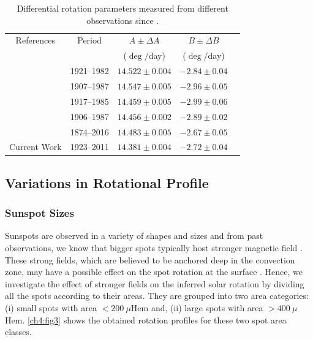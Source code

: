 \begin{table}
\centering
\begin{tabular}{ ccccc }
\hline
     References  & Period  & $A \pm \Delta A$ & $B \pm \Delta B$ \\
      & & ($\deg$$/$day) & ($\deg$$/$day) & \\
    \hline

    \citet{Howard1984}         & 1921--1982 & $14.522  \pm 0.004$   & $-2.84 \pm 0.04$    \\
    \citet{Howard1999}
                            & 1907--1987 & $14.547\pm 0.005$     & $-2.96\pm 0.05$     \\
    \citet{Howard1999}
                           & 1917--1985 & $14.459\pm 0.005$     & $-2.99\pm 0.06$     \\
    \citet{Gupta1999}
                          & 1906--1987  & $14.456 \pm 0.002$    & $-2.89 \pm 0.02$    \\
    \citet{Ruzdjak2017}
                          & 1874--2016  & $14.483\pm 0.005$     & $-2.67\pm 0.05$     \\

    Current Work
                           & 1923--2011 & $14.381\pm 0.004$        & $-2.72\pm0.04$  \\
\hline
\end{tabular}
\caption{Differential rotation parameters measured from different observations since \citeyear{Carrington1863}.}
\label{ch4:table1}
\end{table}

\subsection{Variations in Rotational Profile}

\subsubsection{Sunspot Sizes}
\label{sizes}
Sunspots are observed in a variety of shapes and sizes and from past observations, we know that bigger spots typically host stronger magnetic field \citep{MunozJaramillo2015}. These strong fields, which are believed to be anchored deep in the convection zone, may have a possible effect on the spot rotation at the surface \citep{Ward1966, Gilman1983, Gupta1999}. Hence, we investigate the effect of stronger fields on the inferred solar rotation by dividing all the spots according to their areas. They are grouped into two area categories:  (i) small spots with area  $<200~\mu$Hem and, (ii) large spots with area  $>400~\mu$Hem. \autoref{ch4:fig3} shows the obtained rotation profiles for these two spot area classes.


